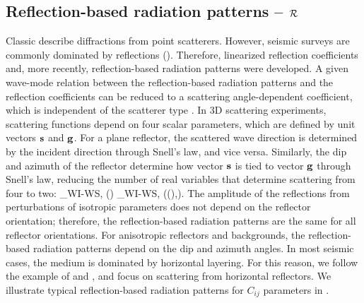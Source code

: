 \subsection{Reflection-based radiation patterns -- $\mathcal{R}$}
Classic \dP describe diffractions from point scatterers. However, seismic 
surveys are commonly dominated by reflections (). Therefore, linearized reflection coefficients 
\citep[e.g.,][]{ruger1997} and, more recently, reflection-based radiation patterns 
\citep{shaw2004,gholami20131,alkhalifah2014} were developed. A given wave-mode relation 
between the reflection-based radiation patterns and the reflection coefficients can be reduced to a scattering angle-dependent coefficient, which is independent of the scatterer 
type \citep{shaw2004}.
%
In 3D scattering experiments, scattering functions depend on four scalar 
parameters, which are defined by unit vectors $\mathbf{s}$ and $\mathbf{g}$. For a plane reflector, 
the scattered wave direction is determined by the incident direction through Snell's law, and vice 
versa. Similarly, the dip and azimuth of the reflector determine how 
vector $\mathbf{s}$ is tied to vector $\mathbf{g}$ through Snell's law, reducing 
the number of real variables that determine scattering from four to two:
%
\beq \label{eq:reflPat}
\Rp_{WI-WS, \delta \mv}(\gv) \equiv \Dp_{WI-WS, \delta \mv}(\sv(\gv),\gv). 
\eeq
%
The amplitude of the reflections from perturbations of isotropic parameters does 
not depend on the reflector orientation; therefore, the reflection-based 
radiation patterns are the same for all reflector orientations. For anisotropic 
reflectors and backgrounds, the reflection-based radiation patterns depend on 
the dip and azimuth angles. In most seismic cases, the medium is dominated by 
horizontal layering. For this reason, we follow the example of \cite{gholami20131} and \cite{alkhalifah2014}, and focus on scattering from horizontal reflectors. We illustrate typical reflection-based radiation patterns for $C_{ij}$ parameters in .

 




